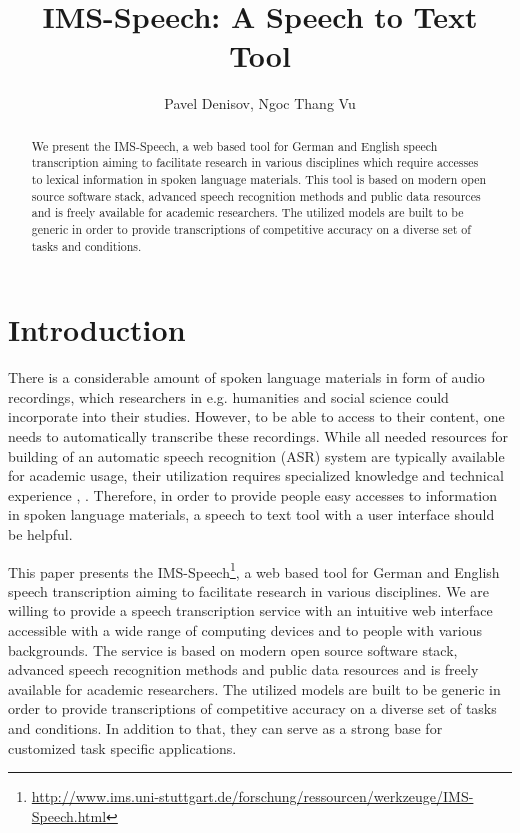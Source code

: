\documentclass[12pt,a4paper]{article}
\title{IMS-Speech: A Speech to Text Tool}
\author{Pavel Denisov, Ngoc Thang Vu}
\affil{Institute for Natural Language Processing (IMS), University of Stuttgart}
\begin{document}

\maketitle

\begin{abstract}
We present the IMS-Speech, a web based tool for German and English speech transcription aiming to facilitate research in various disciplines which require accesses to lexical information in spoken language materials. 
This tool is based on modern open source software stack, advanced speech recognition methods and public data resources and is freely available for academic researchers.
The utilized models are built to be generic in order to provide transcriptions of competitive accuracy on a diverse set of tasks and conditions.
\end{abstract}


\section{Introduction}

There is a considerable amount of spoken language materials in form of audio recordings, which researchers in e.g. humanities and social science could incorporate into their studies.
However, to be able to access to their content, one needs to automatically transcribe these recordings. 
While all needed resources for building of an automatic speech recognition (ASR) system are typically available for academic usage, their utilization requires specialized knowledge and technical experience \cite{povey2011kaldi}, \cite{watanabe2018espnet}.
Therefore, in order to provide people easy accesses to information in spoken language materials, a speech to text tool with a user interface should be helpful.

This paper presents the IMS-Speech\footnote{\url{http://www.ims.uni-stuttgart.de/forschung/ressourcen/werkzeuge/IMS-Speech.html}},
a web based tool for German and English speech transcription aiming to facilitate research in various disciplines. 
We are willing to provide a speech transcription service with an intuitive web interface accessible with a wide range of computing devices and to people with various backgrounds.
The service is based on modern open source software stack, advanced speech recognition methods and public data resources and is freely available for academic researchers.
The utilized models are built to be generic in order to provide transcriptions of competitive accuracy on a diverse set of tasks and conditions.
In addition to that, they can serve as a strong base for customized task specific applications.
 
\end{document}

